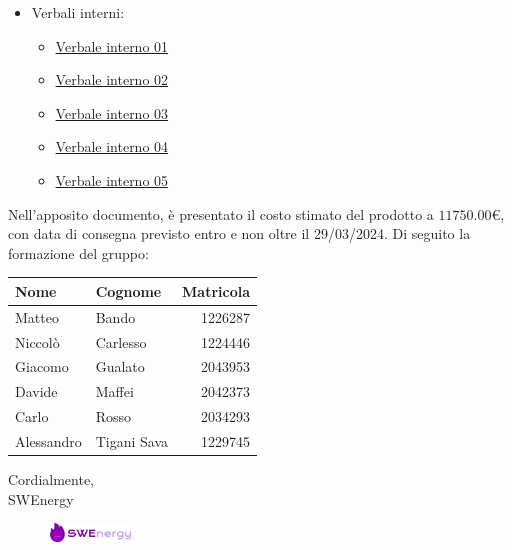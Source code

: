 \begin{itemize}
	\item Verbali interni:
		\begin{itemize}
			\item
				\href{https://github.com/Project-SWEnergy/documentazione/blob/main/Candidatura/Verbali/Interni/Verbale%20interno%20-%2001.pdf}{Verbale interno 01}
			\item
				\href{https://github.com/Project-SWEnergy/documentazione/blob/main/Candidatura/Verbali/Interni/Verbale%20interno%20-%2002.pdf}{Verbale interno 02}
			\item
				\href{https://github.com/Project-SWEnergy/documentazione/blob/main/Candidatura/Verbali/Interni/Verbale%20interno%20-%2003.pdf}{Verbale interno 03}
			\item
				\href{https://github.com/Project-SWEnergy/documentazione/blob/main/Candidatura/Verbali/Interni/Verbale%20interno%20-%2004.pdf}{Verbale interno 04}
			\item
				\href{https://github.com/Project-SWEnergy/documentazione/blob/main/Candidatura/Verbali/Interni/Verbale%20interno%20-%2005.pdf}{Verbale interno 05}
		\end{itemize}
\end{itemize}


Nell’apposito documento, è presentato il costo stimato del prodotto a 
$11750.00$€, 
con data di consegna previsto entro e non oltre il 29/03/2024. Di seguito la
formazione del gruppo:

\begin{center}
{
\renewcommand{\arraystretch}{1.5}
\begin{tabular}{llr}
	\textbf{Nome} & \textbf{Cognome}	& \textbf{Matricola}		\\
	\toprule
	Matteo		&	Bando				&	1226287					\\
	Niccolò 	&	Carlesso		 	& 	1224446					\\
	Giacomo 	&	Gualato			 	& 	2043953					\\
	Davide		&	Maffei			 	& 	2042373					\\
	Carlo		&	Rosso			 	&	2034293					\\
	Alessandro	&	Tigani Sava		 	&	1229745					\\
	\bottomrule
\end{tabular}
}
\end{center}

\vspace{1cm}

\noindent
Cordialmente, \\
SWEnergy

\begin{figure}[H]
	\includegraphics[width=0.2\textwidth]{img/sign.png}
\end{figure}
